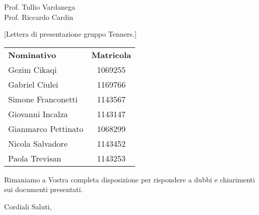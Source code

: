 \begin{letter}{\begin{flushright}
			Prof. Tullio Vardanega \\
			Prof. Riccardo Cardin 
	\end{flushright}}[Lettera di presentazione gruppo Tenners.]
\begin{center}
    	\begin{longtable}{|p{5cm}|c|}
        	\rowcolor{header}
    	    \textbf{Nominativo} & \textbf{Matricola} \\
    		Gezim Cikaqi & 1069255 \\
    		Gabriel Ciulei & 1169766\\
    		Simone Franconetti & 1143567\\
    		Giovanni Incalza & 1143147 \\
    		Gianmarco Pettinato & 1068299 \\
    		Nicola Salvadore & 1143452 \\
    		Paola Trevisan & 1143253\\
        \end{longtable}
     \end{center}
    Rimaniamo a Vostra completa disposizione per rispondere a dubbi e chiarimenti sui documenti presentati.
    \closing{ Cordiali Saluti,}
\end{letter}